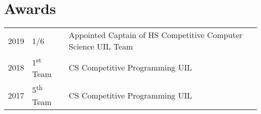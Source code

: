 \documentclass[letterpaper]{deedy-resume} %
\begin{document}
\begin{minipage}[t]{0.66\textwidth}
\sectionspace %


\section{Awards} 

\begin{tabular}{rll}
2019	 & 1/6 & Appointed Captain of HS Competitive Computer Science UIL Team\\
2018	 & 1\textsuperscript{st} Team & CS Competitive Programming UIL \\
2017	 & 5\textsuperscript{th} Team & CS Competitive Programming UIL\\
\end{tabular}

\sectionspace %

%
%
%


\end{minipage} %



\end{document}
